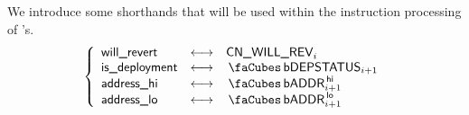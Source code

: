 We introduce some shorthands that will be used within the instruction processing of 's.
\[
	\left\{ \begin{array}{lcl}
		\locWillRevert      & \longleftrightarrow & \cnWillRev            _{i    } \\
		\locDeploys         & \longleftrightarrow & \cnCodeDepStatus      _{i + 1} \\
		\locAddressHi       & \longleftrightarrow & \cnCodeAddress\high   _{i + 1} \\
		\locAddressLo       & \longleftrightarrow & \cnCodeAddress\low    _{i + 1} \\
	\end{array} \right.
\]
